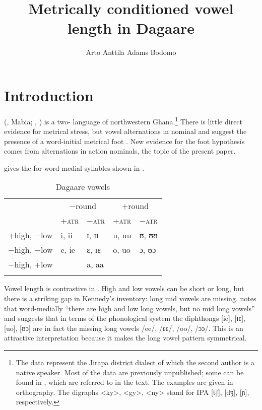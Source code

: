 \documentclass[output=paper,newtxmath,modfonts,nonflat,draftmode]{langsci/langscibook}
\author{Arto Anttila\affiliation{Stanford University} \lastand Adams Bodomo\affiliation{University of Vienna}}
\title{Metrically conditioned
vowel length in Dagaare}
\begin{document}
\maketitle
\section{Introduction}


 (, Mabia; \citealt{Naden1989}, \citealt{Bodomo1997}) is a two- language of northwestern Ghana.\footnote{The data represent the Jirapa district dialect of which the second author is a native speaker. Most of the data are previously unpublished; some can be found in \citep{Kennedy1966, Bodomo1997, Anttila&Bodomo2009}, which are referred to in the text. The examples are given in  orthography. The digraphs <ky>, <gy>, <ny> stand for IPA [tʃ], [dʒ], [ɲ], respectively.} There is little direct evidence for metrical stress, but vowel alternations in nominal and  suggest the presence of a word-initial metrical foot  \citep{Anttila&Bodomo2009}. New evidence for the foot hypothesis comes from  alternations in action nominals, the topic of the present paper.



\citet[9]{Kennedy1966} gives the  for  word-medial syllables shown in . 

\begin{table}
\begin{tabularx}{\textwidth}{XXXXX}
\lsptoprule
 & \multicolumn{2}{c}{{$-$round}} & \multicolumn{2}{c}{{$+$round}}\\
 & +\textsc{atr}  & $-$\textsc{atr} & +\textsc{atr} & $-$\textsc{atr}\\
\midrule
+high, $-$low & i, ii & ɪ, ɪɪ & u, uu & ʊ, ʊʊ\\
$-$high, $-$low & e, ie & ɛ, ɪɛ & o, uo & ɔ, ʊɔ\\
$-$high, +low &  & a, aa &  & \\
\lspbottomrule
\end{tabularx}
\caption{Dagaare vowels \citep{Kennedy1966}}
\label{tab:anttila:1}
\end{table}


Vowel length is contrastive in . High and low vowels can be short or long, but there is a striking gap in Kennedy’s inventory: long mid vowels are missing. \citet[8]{Kennedy1966} notes that word-medially “there are high and low long vowels, but no mid long vowels” and suggests that in terms of the phonological system the diphthongs [ie], [ɪɛ], [uo], [ʊɔ] are in fact the missing long vowels /ee/, /ɛɛ/, /oo/, /ɔɔ/. This is an attractive interpretation because it makes the long vowel pattern symmetrical. 
\end{document}
